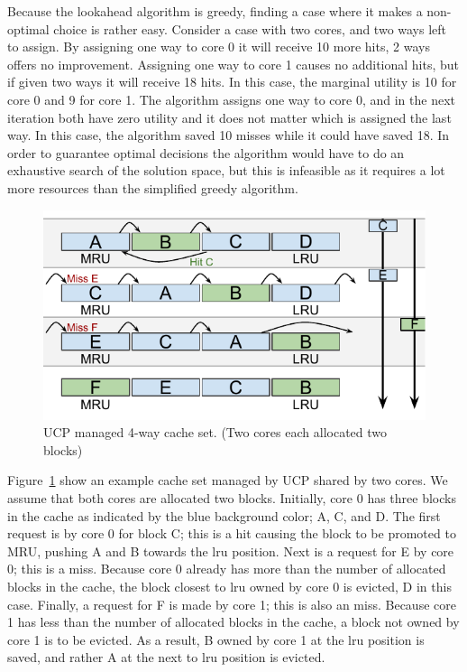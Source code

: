 Because the lookahead algorithm is greedy, finding a case where it makes a non-optimal choice is rather easy.
Consider a case with two cores, and two ways left to assign.
By assigning one way to core 0 it will receive 10 more hits, 2 ways offers no improvement.
Assigning one way to core 1 causes no additional hits, but if given two ways it will receive 18 hits.
In this case, the marginal utility is 10 for core 0 and 9 for core 1.
The algorithm assigns one way to core 0, and in the next iteration both have zero utility and it does not matter which is assigned the last way.
In this case, the algorithm saved 10 misses while it could have saved 18.
In order to guarantee optimal decisions the algorithm would have to do an exhaustive search of the solution space, but this is infeasible as it requires a lot more resources than the simplified greedy algorithm.

\begin{figure}[ht]
    \centering
    \includegraphics[width=.65\textwidth]{figures/algorithms/UCP}
    \caption[UCP managed 4-way cache set.]{UCP managed 4-way cache set. (Two cores each allocated two blocks)}
    \label{fig:algorithms:ucp_example}
\end{figure}

Figure~\ref{fig:algorithms:ucp_example} show an example cache set managed by UCP shared by two cores.
We assume that both cores are allocated two blocks.
Initially, core 0 has three blocks in the cache as indicated by the blue background color; A, C, and D.
The first request is by core 0 for block C; this is a hit causing the block to be promoted to MRU, pushing A and B towards the \gls{lru} position.
Next is a request for E by core 0; this is a miss.
Because core 0 already has more than the number of allocated blocks in the cache, the block closest to \gls{lru} owned by core 0 is evicted, D in this case.
Finally, a request for F is made by core 1; this is also an miss.
Because core 1 has less than the number of allocated blocks in the cache, a block not owned by core 1 is to be evicted.
As a result, B owned by core 1 at the \gls{lru} position is saved, and rather A at the next to \gls{lru} position is evicted.



